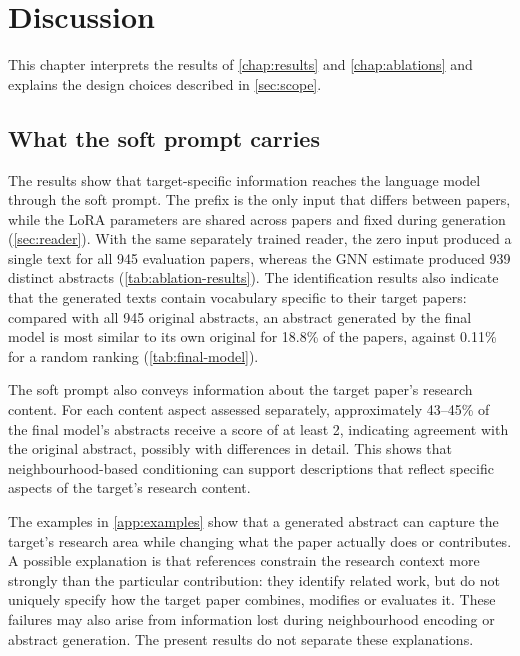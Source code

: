 \chapter{Discussion}
\label{chap:discussion}

This chapter interprets the results of \autoref{chap:results} and \autoref{chap:ablations} and explains the design choices described in \autoref{sec:scope}.

\section{What the soft prompt carries}
\label{sec:disc-carries}

The results show that target-specific information reaches the language model through the soft prompt. The prefix is the only input that differs between papers, while the LoRA parameters are shared across papers and fixed during generation (\autoref{sec:reader}). With the same separately trained reader, the zero input produced a single text for all 945 evaluation papers, whereas the GNN estimate produced 939 distinct abstracts (\autoref{tab:ablation-results}). The identification results also indicate that the generated texts contain vocabulary specific to their target papers: compared with all 945 original abstracts, an abstract generated by the final model is most similar to its own original for 18.8\% of the papers, against 0.11\% for a random ranking (\autoref{tab:final-model}).

The soft prompt also conveys information about the target paper's research content. For each content aspect assessed separately, approximately 43--45\% of the final model's abstracts receive a score of at least 2, indicating agreement with the original abstract, possibly with differences in detail. This shows that neighbourhood-based conditioning can support descriptions that reflect specific aspects of the target's research content.

The examples in \autoref{app:examples} show that a generated abstract can capture the target's research area while changing what the paper actually does or contributes. A possible explanation is that references constrain the research context more strongly than the particular contribution: they identify related work, but do not uniquely specify how the target paper combines, modifies or evaluates it. These failures may also arise from information lost during neighbourhood encoding or abstract generation. The present results do not separate these explanations.

